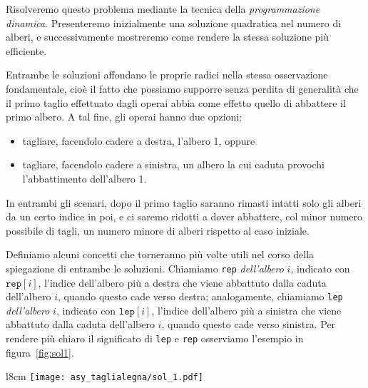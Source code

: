 \newpage
\setcounter{figure}{0}
\pagecolor{backcolor}
\Solution

\Intro
Risolveremo questo problema mediante la tecnica della \emph{programmazione dinamica}. Presenteremo inizialmente una soluzione quadratica nel numero di alberi, e successivamente mostreremo come rendere la stessa soluzione più efficiente.

Entrambe le soluzioni affondano le proprie radici nella stessa osservazione fondamentale, cioè il fatto che possiamo supporre senza perdita di generalità che il primo taglio effettuato dagli operai abbia come effetto quello di abbattere il primo albero. A tal fine, gli operai hanno due opzioni:
\begin{itemize}[nolistsep, itemsep=2mm]
	\item tagliare, facendolo cadere a destra, l'albero 1, oppure
	\item tagliare, facendolo cadere a sinistra, un albero la cui caduta provochi l'abbattimento dell'albero 1.
\end{itemize}
In entrambi gli scenari, dopo il primo taglio saranno rimasti intatti solo gli alberi da un certo indice in poi, e ci saremo ridotti a dover abbattere, col minor numero possibile di tagli, un numero minore di alberi rispetto al caso iniziale.

\Nquadro
Definiamo alcuni concetti che torneranno più volte utili nel corso della spiegazione di entrambe le soluzioni. Chiamiamo \texttt{rep} \emph{dell'albero} $i$, indicato con $\texttt{rep}[i]$, l'indice dell'albero più a destra che viene abbattuto dalla caduta dell'albero $i$, quando questo cade verso destra; analogamente, chiamiamo \texttt{lep} \emph{dell'albero} $i$, indicato con $\texttt{lep}[i]$, l'indice dell'albero più a sinistra che viene abbattuto dalla caduta dell'albero $i$, quando questo cade verso sinistra. Per rendere più chiaro il significato di \texttt{lep} e \texttt{rep} osserviamo l'esempio in figura~\ref{fig:sol1}.

\begin{wrapfigure}{l}{8cm}
	\vspace*{-.5cm}
	\centering\texttt{[image: asy\_taglialegna/sol\_1.pdf]}
	\caption{}
	\label{fig:sol1}
    \vspace*{-.6cm}
\end{wrapfigure}

